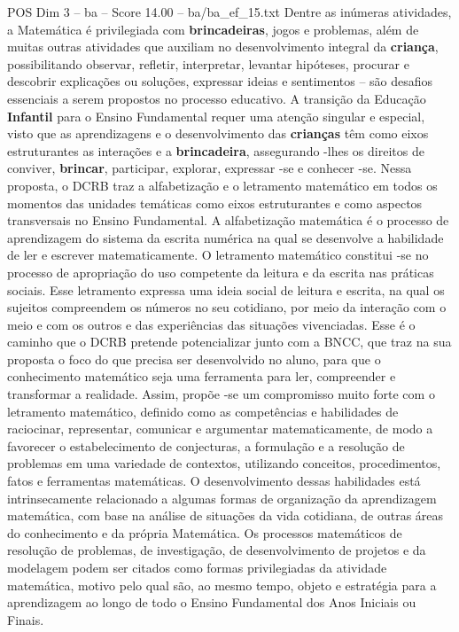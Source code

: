 \begin{textsample}{POS Dim 3 – ba – Score 14.00 – ba/ba\_ef\_15.txt}
Dentre as inúmeras atividades, a Matemática é privilegiada com \textbf{brincadeiras}, jogos e problemas, além de muitas outras atividades que auxiliam no desenvolvimento integral da \textbf{criança}, possibilitando observar, refletir, interpretar, levantar hipóteses, procurar e descobrir explicações ou soluções, expressar ideias e sentimentos – são desafios essenciais a serem propostos no processo educativo.
A transição da Educação \textbf{Infantil} para o Ensino Fundamental requer uma atenção singular e especial, visto que as aprendizagens e o desenvolvimento das \textbf{crianças} têm como eixos estruturantes as interações e a \textbf{brincadeira}, assegurando -lhes os direitos de conviver, \textbf{brincar}, participar, explorar, expressar -se e conhecer -se.
Nessa proposta, o DCRB traz a alfabetização e o letramento matemático em todos os momentos das unidades temáticas como eixos estruturantes e como aspectos transversais no Ensino Fundamental.
A alfabetização matemática é o processo de aprendizagem do sistema da escrita numérica na qual se desenvolve a habilidade de ler e escrever matematicamente.
O letramento matemático constitui -se no processo de apropriação do uso competente da leitura e da escrita nas práticas sociais.
Esse letramento expressa uma ideia social de leitura e escrita, na qual os sujeitos compreendem os números no seu cotidiano, por meio da interação com o meio e com os outros e das experiências das situações vivenciadas.
Esse é o caminho que o DCRB pretende potencializar junto com a BNCC, que traz na sua proposta o foco do que precisa ser desenvolvido no aluno, para que o conhecimento matemático seja uma ferramenta para ler, compreender e transformar a realidade.
Assim, propõe -se um compromisso muito forte com o letramento matemático, definido como as competências e habilidades de raciocinar, representar, comunicar e argumentar matematicamente, de modo a favorecer o estabelecimento de conjecturas, a formulação e a resolução de problemas em uma variedade de contextos, utilizando conceitos, procedimentos, fatos e ferramentas matemáticas.
O desenvolvimento dessas habilidades está intrinsecamente relacionado a algumas formas de organização da aprendizagem matemática, com base na análise de situações da vida cotidiana, de outras áreas do conhecimento e da própria Matemática.
Os processos matemáticos de resolução de problemas, de investigação, de desenvolvimento de projetos e da modelagem podem ser citados como formas privilegiadas da atividade matemática, motivo pelo qual são, ao mesmo tempo, objeto e estratégia para a aprendizagem ao longo de todo o Ensino Fundamental dos Anos Iniciais ou Finais.

\end{textsample}
